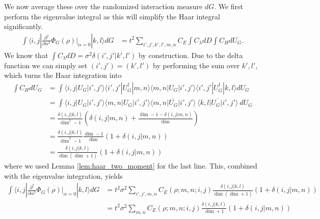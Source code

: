 \documentclass{article}
\newcommand{\ket}[1]{|#1\rangle}
\newcommand{\bra}[1]{\langle #1|}
\newcommand{\parens}[1]{\left( #1 \right)}
\begin{document}
We now average these over the randomized interaction measure $dG$. We first perform the eigenvalue integral as this will simplify the Haar integral significantly. 
\begin{align}
    \int \bra{i,j} \frac{\partial^2}{\partial \alpha^2} \Phi_G(\rho) \bigg|_{\alpha = 0} \ket{k,l} dG &= t^2 \sum_{i',j',k',l',m,n} C_E \int C_{\lambda} dD \int C_{H} dU_G.
\end{align}
We know that $\int C_{\lambda} dD = \sigma^2 \delta(i',j' | k',l')$ by construction. Due to the delta function we can simply set $(i',j') = (k',l')$ by performing the sum over $k',l'$, which turns the Haar integration into
\begin{align}
    \int C_{H} dU_G &= \int \bra{i,j} U_G \ket{i',j'} \bra{i',j'} U_G^\dagger \ket{m,n} \bra{m,n} U_G \ket{i',j'} \bra{i',j'} U_G^\dagger \ket{k,l} dU_G \\
    &= \int \bra{i,j} U_G \ket{i',j'}  \bra{m,n} U_G \ket{i',j'} \overline{\bra{m,n} U_G \ket{i',j'}} ~ \overline{ \bra{k,l} U_G \ket{i',j'} }~ dU_G \\
    &= \frac{\delta(i,j | k,l)}{\dim^2 - 1} \parens{\delta(i,j | m,n) + \frac{\dim - 1 - \delta(i,j | m,n)}{\dim}} \\
    &= \frac{\delta(i,j | k,l)}{\dim^2 - 1} \frac{\dim - 1}{\dim} \parens{1 + \delta(i,j | m,n)} \\
    &= \frac{\delta(i, j | k,l)}{\dim (\dim + 1)} (1 + \delta(i,j | m,n))
\end{align}
where we used Lemma \ref{lem:haar_two_moment} for the last line. This, combined with the eigenvalue integration, yields
\begin{align}
    \int \bra{i,j} \frac{\partial^2}{\partial \alpha^2} \Phi_G(\rho) \bigg|_{\alpha = 0} \ket{k,l} dG &= t^2 \sigma^2 \sum_{i',j',m,n} C_E(\rho; m,n; i,j) \frac{\delta(i, j | k,l)}{\dim (\dim + 1)} (1 + \delta(i,j | m,n)) \\
    &= t^2 \sigma^2 \sum_{m,n} C_E(\rho; m,n; i,j) \frac{\delta(i, j | k,l)}{\dim + 1
    } (1 + \delta(i,j | m,n))
\end{align}
\end{document}
